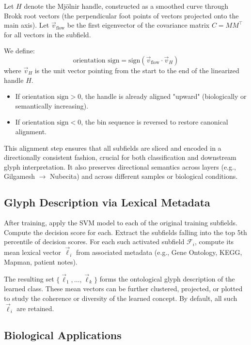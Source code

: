         Let $H$ denote the Mj\"olnir handle, constructed as a smoothed curve through Brokk root vectors (the perpendicular foot points of vectors projected onto the main axis). Let $\vec{v}_{\text{flow}}$ be the first eigenvector of the covariance matrix $C = M M^\top$ for all vectors in the subfield.

        We define:
        \[
            \text{orientation sign} = \mathrm{sign}\left( \vec{v}_{\text{flow}} \cdot \vec{v}_{H} \right)
        \]
        where $\vec{v}_H$ is the unit vector pointing from the start to the end of the linearized handle $H$.

        \begin{itemize}
            \item If $\text{orientation sign} > 0$, the handle is already aligned "upward" (biologically or semantically increasing).
            \item If $\text{orientation sign} < 0$, the bin sequence is reversed to restore canonical alignment.
        \end{itemize}

        This alignment step ensures that all subfields are sliced and encoded in a directionally consistent fashion, crucial for both classification and downstream glyph interpretation. It also preserves directional semantics across layers (e.g., Gilgamesh $\rightarrow$ Nubecita) and across different samples or biological conditions.

    \subsection{Glyph Description via Lexical Metadata}

        After training, apply the SVM model to each of the original training subfields. Compute the decision score for each. Extract the subfields falling into the top 5th percentile of decision scores. For each such activated subfield $\mathcal{F}_i$, compute its mean lexical vector $\vec{\ell}_i$ from associated metadata (e.g., Gene Ontology, KEGG, Mapman, patient notes).

        The resulting set $\{\vec{\ell}_1, \dots, \vec{\ell}_k\}$ forms the ontological glyph description of the learned class. These mean vectors can be further clustered, projected, or plotted to study the coherence or diversity of the learned concept. By default, all such $\vec{\ell}_i$ are retained.

    \subsection{Biological Applications}

